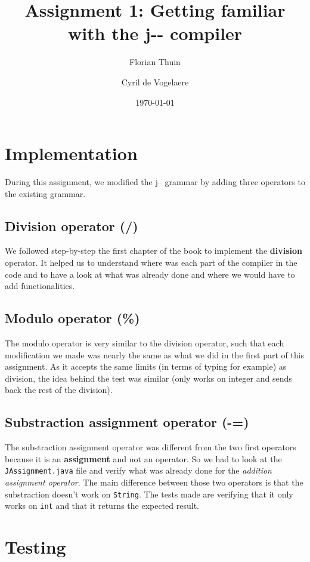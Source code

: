\documentclass{article}
\author{Florian Thuin \and Cyril de Vogelaere}
\title{Assignment 1: Getting familiar with the j-\phantom{}- compiler}
\date{\today}
\begin{document}
    \maketitle
    
    \section{Implementation}

	During this assignment, we modified the j-- grammar by adding three operators
	to the existing grammar.  
    
    \subsection{Division operator (/)}
    We followed step-by-step the first chapter of the book to implement the
    \textbf{division} operator. It helped us to understand where was each part
    of the compiler in the code and to have a look at what was already done and
    where we would have to add functionalities.

    \subsection{Modulo operator (\%)}
    The modulo operator is very similar to the division operator, such that
    each modification we made was nearly the same as what we did in the first
    part of this assignment. As it accepts the same limits (in terms of typing
    for example) as division, the idea behind the test was similar (only works
    on integer and sends back the rest of the division).

    \subsection{Substraction assignment operator (-=)}
    The substraction assignment operator was different from the two first
    operators because it is an \textbf{assignment} and not an operator. So we
    had to look at the \verb#JAssignment.java# file and verify what was already
    done for the \textit{addition assignment operator}. The main difference
    between those two operators is that the substraction doesn't work on
    \verb#String#. The tests made are verifying that it only works on \verb#int#
    and that it returns the expected result.
    
    \section{Testing}
    
\end{document}
